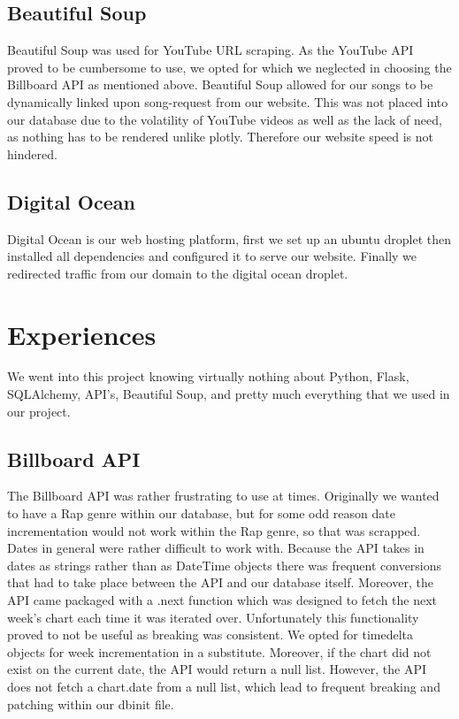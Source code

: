 \documentclass{article}
\begin{document}
\subsection*{Beautiful Soup}
Beautiful Soup was used for YouTube URL scraping.
As the YouTube API proved to be cumbersome to use, we opted for which we neglected in choosing the Billboard API as mentioned above.
Beautiful Soup allowed for our songs to be dynamically linked upon song-request from our website.
This was not placed into our database due to the volatility of YouTube videos as well as the lack of need, as nothing has to be rendered unlike plotly. 
Therefore our website speed is not hindered. 
\subsection*{Digital Ocean}
Digital Ocean is our web hosting platform, first we set up an ubuntu droplet then installed all dependencies and configured it to serve our website. Finally we redirected traffic from our domain to the digital ocean droplet.


\section*{Experiences}
We went into this project knowing virtually nothing about Python, Flask, SQLAlchemy, API's, Beautiful Soup, and pretty much everything that we used in our project.
\subsection*{Billboard API}
The Billboard API was rather frustrating to use at times.
Originally we wanted to have a Rap genre within our database, but for some odd reason date incrementation would not work within the Rap genre, so that was scrapped.
Dates in general were rather difficult to work with.
Because the API takes in dates as strings rather than as DateTime objects there was frequent conversions that had to take place between the API and our database itself.
Moreover, the API came packaged with a .next function which was designed to fetch the next week's chart each time it was iterated over.
Unfortunately this functionality proved to not be useful as breaking was consistent.
We opted for timedelta objects for week incrementation in a substitute. 
Moreover, if the chart did not exist on the current date, the API would return a null list.
However, the API does not fetch a chart.date from a null list, which lead to frequent breaking and patching within our dbinit file.
\end{document}
